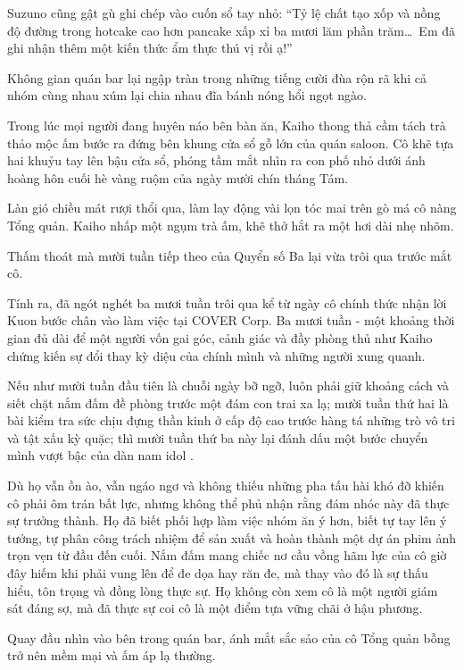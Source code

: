 \documentclass[../main.tex]{subfiles}
\begin{document}
Suzuno cũng gật gù ghi chép vào cuốn sổ tay nhỏ: ``Tỷ lệ chất tạo xốp và nồng độ đường trong hotcake cao hơn pancake xấp xỉ ba mươi lăm phần trăm\dots\ Em đã ghi nhận thêm một kiến thức ẩm thực thú vị rồi ạ!''

Không gian quán bar lại ngập tràn trong những tiếng cười đùa rộn rã khi cả nhóm cùng nhau xúm lại chia nhau đĩa bánh nóng hổi ngọt ngào.

\il

Trong lúc mọi người đang huyên náo bên bàn ăn, Kaiho thong thả cầm tách trà thảo mộc ấm bước ra đứng bên khung cửa sổ gỗ lớn của quán saloon. Cô khẽ tựa hai khuỷu tay lên bậu cửa sổ, phóng tầm mắt nhìn ra con phố nhỏ dưới ánh hoàng hôn cuối hè vàng ruộm của ngày mười chín tháng Tám.

Làn gió chiều mát rượi thổi qua, làm lay động vài lọn tóc mai trên gò má cô nàng Tổng quản. Kaiho nhấp một ngụm trà ấm, khẽ thở hắt ra một hơi dài nhẹ nhõm.

Thấm thoát mà mười tuần tiếp theo của Quyển số Ba lại vừa trôi qua trước mắt cô.

Tính ra, đã ngót nghét ba mươi tuần trôi qua kể từ ngày cô chính thức nhận lời Kuon bước chân vào làm việc tại COVER Corp. Ba mươi tuần - một khoảng thời gian đủ dài để một người vốn gai góc, cảnh giác và đầy phòng thủ như Kaiho chứng kiến sự đổi thay kỳ diệu của chính mình và những người xung quanh.

Nếu như mười tuần đầu tiên là chuỗi ngày bỡ ngỡ, luôn phải giữ khoảng cách và siết chặt nắm đấm đề phòng trước một đám con trai xa lạ; mười tuần thứ hai là bài kiểm tra sức chịu đựng thần kinh ở cấp độ cao trước hàng tá những trò vô tri và tật xấu kỳ quặc; thì mười tuần thứ ba này lại đánh dấu một bước chuyển mình vượt bậc của dàn nam idol \hls.

Dù họ vẫn ồn ào, vẫn ngáo ngơ và không thiếu những pha tấu hài khó đỡ khiến cô phải ôm trán bất lực, nhưng không thể phủ nhận rằng đám nhóc này đã thực sự trưởng thành. Họ đã biết phối hợp làm việc nhóm ăn ý hơn, biết tự tay lên ý tưởng, tự phân công trách nhiệm để sản xuất và hoàn thành một dự án phim ảnh trọn vẹn từ đầu đến cuối. Nắm đấm mang chiếc nơ cầu vồng hãm lực của cô giờ đây hiếm khi phải vung lên để đe dọa hay răn đe, mà thay vào đó là sự thấu hiểu, tôn trọng và đồng lòng thực sự. Họ không còn xem cô là một người giám sát đáng sợ, mà đã thực sự coi cô là một điểm tựa vững chãi ở hậu phương.

Quay đầu nhìn vào bên trong quán bar, ánh mắt sắc sảo của cô Tổng quản bỗng trở nên mềm mại và ấm áp lạ thường.
\end{document}

